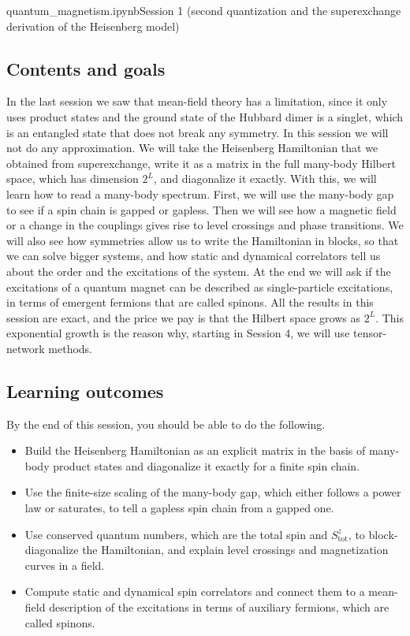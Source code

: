 \documentclass[lecture_notes.tex]{subfiles}
\begin{document}
%
  {quantum\_magnetism.ipynb}{Session 1 (second quantization and the superexchange derivation of the
  Heisenberg model)}

\subsection*{Contents and goals}
In the last session we saw that mean-field theory has a limitation, since it only uses product
states and the ground state of the Hubbard dimer is a singlet, which is an entangled state that
does not break any symmetry. In this session we will not do any approximation. We will take the
Heisenberg Hamiltonian that we obtained from superexchange, write it as a matrix in the full
many-body Hilbert space, which has dimension $2^L$, and diagonalize it exactly. With this, we will
learn how to read a many-body spectrum. First, we will use the many-body gap to see if a spin chain
is gapped or gapless. Then we will see how a magnetic field or a change in the couplings gives rise
to level crossings and phase transitions. We will also see how symmetries allow us to write the
Hamiltonian in blocks, so that we can solve bigger systems, and how static and dynamical correlators
tell us about the order and the excitations of the system. At the end we will ask if the
excitations of a quantum magnet can be described as single-particle excitations, in terms of
emergent fermions that are called spinons. All the results in this session are exact, and the price
we pay is that the Hilbert space grows as $2^L$. This exponential growth is the reason why, starting
in Session 4, we will use tensor-network methods.

\subsection*{Learning outcomes}
By the end of this session, you should be able to do the following.
\begin{itemize}[nosep]
  \item Build the Heisenberg Hamiltonian as an explicit matrix in the basis of many-body product
    states and diagonalize it exactly for a finite spin chain.
  \item Use the finite-size scaling of the many-body gap, which either follows a power law or
    saturates, to tell a gapless spin chain from a gapped one.
  \item Use conserved quantum numbers, which are the total spin and $S_{\mathrm{tot}}^z$, to
    block-diagonalize the Hamiltonian, and explain level crossings and magnetization curves in a
    field.
  \item Compute static and dynamical spin correlators and connect them to a mean-field description
    of the excitations in terms of auxiliary fermions, which are called spinons.
\end{itemize}
\end{document}
